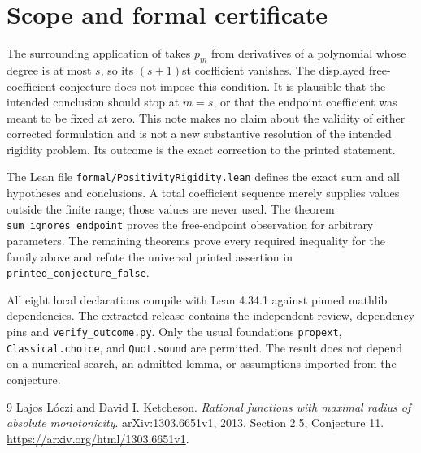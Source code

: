 \documentclass[11pt]{article}
\begin{document}
\section{Scope and formal certificate}
The surrounding application of \cite{source} takes $p_m$ from derivatives of a polynomial whose degree is at most $s$, so its $(s+1)$st coefficient vanishes. The displayed free-coefficient conjecture does not impose this condition. It is plausible that the intended conclusion should stop at $m=s$, or that the endpoint coefficient was meant to be fixed at zero. This note makes no claim about the validity of either corrected formulation and is not a new substantive resolution of the intended rigidity problem. Its outcome is the exact correction to the printed statement.

The Lean file \nolinkurl{formal/PositivityRigidity.lean} defines the exact sum and all hypotheses and conclusions. A total coefficient sequence merely supplies values outside the finite range; those values are never used. The theorem \nolinkurl{sum_ignores_endpoint} proves the free-endpoint observation for arbitrary parameters. The remaining theorems prove every required inequality for the family above and refute the universal printed assertion in \nolinkurl{printed_conjecture_false}.

All eight local declarations compile with Lean 4.34.1 against pinned mathlib dependencies. The extracted release contains the independent review, dependency pins and \nolinkurl{verify_outcome.py}. Only the usual foundations \nolinkurl{propext}, \nolinkurl{Classical.choice}, and \nolinkurl{Quot.sound} are permitted. The result does not depend on a numerical search, an admitted lemma, or assumptions imported from the conjecture.
\begin{thebibliography}{9}
 Lajos Lóczi and David I. Ketcheson. \emph{Rational functions with maximal radius of absolute monotonicity}. arXiv:1303.6651v1, 2013. Section 2.5, Conjecture 11. \url{https://arxiv.org/html/1303.6651v1}.
\end{thebibliography}
\end{document}

